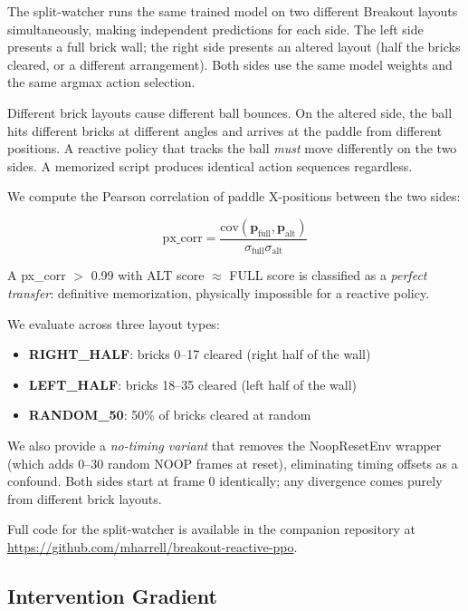 \documentclass[11pt]{article}
\begin{document}
The split-watcher runs the same trained model on two different Breakout layouts
simultaneously, making independent predictions for each side. The left side
presents a full brick wall; the right side presents an altered layout (half
the bricks cleared, or a different arrangement). Both sides use the same model
weights and the same argmax action selection.

Different brick layouts cause different ball
bounces. On the altered side, the ball hits different bricks at different
angles and arrives at the paddle from different positions. A reactive policy
that tracks the ball \emph{must} move differently on the two sides. A memorized
script produces identical action sequences regardless.

We compute the Pearson correlation of paddle X-positions between the two sides:

\begin{equation}
    \text{px\_corr} = \frac{\text{cov}(\mathbf{p}_{\text{full}},
    \mathbf{p}_{\text{alt}})}
    {\sigma_{\text{full}} \sigma_{\text{alt}}}
\end{equation}

A px\_corr $>$ 0.99 with ALT score $\approx$ FULL score is classified as a
\emph{perfect transfer}: definitive memorization, physically impossible for a
reactive policy.

We evaluate across three layout types:
\begin{itemize}
    \item \textbf{RIGHT\_HALF}: bricks 0--17 cleared (right half of the wall)
    \item \textbf{LEFT\_HALF}: bricks 18--35 cleared (left half of the wall)
    \item \textbf{RANDOM\_50}: 50\% of bricks cleared at random
\end{itemize}

We also provide a \emph{no-timing variant} that removes the NoopResetEnv
wrapper (which adds 0--30 random NOOP frames at reset), eliminating timing
offsets as a confound. Both sides start at frame 0 identically; any divergence
comes purely from different brick layouts.

Full code for the split-watcher is available in the companion repository at
\url{https://github.com/mharrell/breakout-reactive-ppo}.

\subsection{Intervention Gradient}
\end{document}
